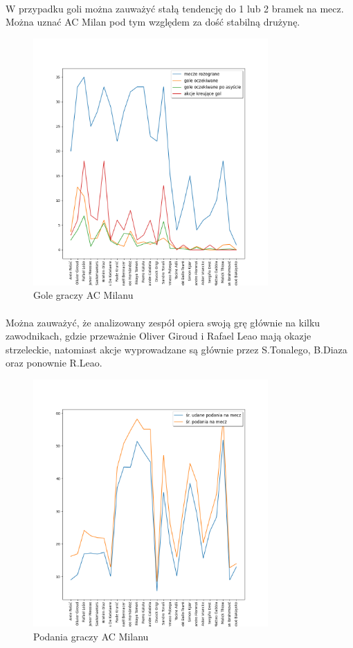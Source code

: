 \documentclass[12pt, letterpaper]{article}
\begin{document}
\paragraph{} W przypadku goli można zauważyć stałą tendencję do 1 lub 2 bramek na mecz. Można uznać AC Milan pod tym względem za dość stabilną drużynę.
\pagebreak
\begin{figure}[ht]
    \centering
    \includegraphics[width=0.8\textwidth]{images/Milan_player_goals.png}
    \caption{Gole graczy AC Milanu}
    \label{fig:enter-label}
\end{figure}
\paragraph{} Można zauważyć, że analizowany zespół opiera swoją grę głównie na kilku zawodnikach, gdzie przeważnie Oliver Giroud i Rafael Leao mają okazje strzeleckie, natomiast akcje wyprowadzane są głównie przez S.Tonalego, B.Diaza oraz ponownie R.Leao.
\pagebreak
\begin{figure}[ht]
    \centering
    \includegraphics[width=0.8\textwidth]{images/Milan_passes.png}
    \caption{Podania graczy AC Milanu}
    \label{fig:enter-label}
\end{figure}
\end{document}
